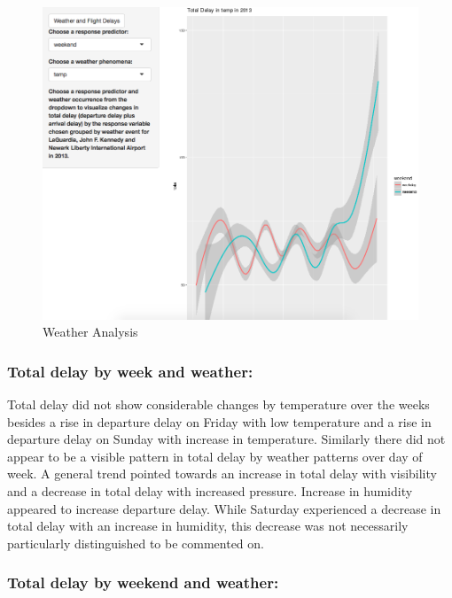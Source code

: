 \documentclass[12pt,twoside]{amherstthesis}
\begin{document}
  \begin{figure}[htbp]
  \centering
  \includegraphics[scale = 0.5,angle = 0]{figure/AppImage2.png}
  \caption[Weather Analysis]{\normalsize{Weather Analysis}}
  \label{fig:shiny3}
  \end{figure}
  
  \subsubsection{Total delay by week and
  weather:}\label{total-delay-by-week-and-weather}
  
  Total delay did not show considerable changes by temperature over the
  weeks besides a rise in departure delay on Friday with low temperature
  and a rise in departure delay on Sunday with increase in temperature.
  Similarly there did not appear to be a visible pattern in total delay by
  weather patterns over day of week. A general trend pointed towards an
  increase in total delay with visibility and a decrease in total delay
  with increased pressure. Increase in humidity appeared to increase
  departure delay. While Saturday experienced a decrease in total delay
  with an increase in humidity, this decrease was not necessarily
  particularly distinguished to be commented on.
  
  \subsubsection{Total delay by weekend and
  weather:}\label{total-delay-by-weekend-and-weather}
  
\end{document}
